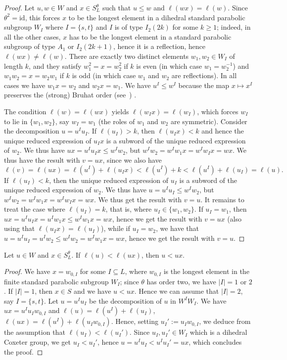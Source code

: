 \documentclass[ALCO, Unicode]{cedram}
\begin{document}
\begin{proof}
	Let $u,w\in W$ and $x\in S_L^\theta$ such that $u\leq w$ and $\ell(wx)=\ell(w)$. Since $\theta^2=\mathrm{id}$, this forces $x$ to be the longest element in a dihedral standard parabolic subgroup $W_I$ where $I=\{s,t\}$ and $I$ is of type $I_2(2k)$ for some $k\geq 1$; indeed, in all the other cases, $x$ has to be the longest element in a standard parabolic subgroup of type $A_1$ or $I_2(2k+1)$, hence it is a reflection, hence $\ell(wx)\neq \ell(w)$. There are exactly two distinct elements $w_1, w_2\in W_I$ of length $k$, and they satisfy $w_1^2=x=w_2^2$ if $k$ is even (in which case $w_1=w_2^{-1}$) and $w_1 w_2=x=w_2 w_1$ if $k$ is odd (in which case $w_1$ and $w_2$ are reflections). In all cases we have $w_1 x=w_2$ and $w_2 x=w_1$. We have $u^I \leq w^I$ because the map $x \mapsto x^I$ preserves the (strong) Bruhat order (see~\cite[Proposition 2.5.1]{BB}) . 
	
	The condition $\ell(w)=\ell(wx)$ yields $\ell(w_I x)=\ell(w_I)$, which forces $w_I$ to lie in $\{w_1, w_2\}$, say $w_I=w_1$ (the roles of $w_1$ and $w_2$ are symmetric). Consider the decomposition $u=u^I u_I$. If $\ell(u_I)>k$, then $\ell(u_I x) < k$ and hence  the unique reduced expression of $u_I x$ is a subword of the unique reduced expression of $w_2$. We thus have $ux = u^I u_Ix \leq w^I w_2$, but $w^I w_2= w^I w_1x=w^I w_I x=wx$. We thus have the result with $v=ux$, since we also have $$\ell(v)=\ell(ux)= \ell(u^I)+\ell(u_I x)< \ell(u^I)+k<\ell(u^I)+\ell(u_I)=\ell(u).$$  
If $\ell(u_I)<k$, then the unique reduced expression of $u_I$ is a subword of the unique reduced expression of $w_2$. We thus have $u=u^I u_I \leq w^I w_2$, but $w^I w_2= w^I w_1 x=w^I w_I x=wx$. We thus get the result with $v=u$. It remains to treat the case where $\ell(u_I)=k$, that is, where $u_I\in \{w_1, w_2\}$. If $u_I=w_1$, then $ux= u^I u_I x= u^I w_1 x \leq w^I w_1 x =wx$, hence we get the result with $v=ux$ (also using that $\ell(u_Ix)=\ell(u_I)$), while if $u_I=w_2$, we have that $u=u^I u_I=u^I w_2 \leq w^I w_2=w^I w_1x=wx$, hence we get the result with $v=u$.
\end{proof}

\begin{lemma}\label{lem_long_gen}
	Let $u\in W$ and $x\in S_L^\theta$. If $\ell(u)< \ell(ux)$, then $u<ux$.
\end{lemma}

\begin{proof}
	We have $x=w_{0,I}$ for some $I\subseteq L$, where $w_{0,I}$ is the longest element in the finite standard parabolic subgroup $W_I$; since $\theta$ has order two, we have $|I|=1$ or $2$. If $|I|=1$, then $x\in S$ and we have $u < ux$. Hence we can assume that $|I|=2$, say $I=\{s,t\}$. Let $u=u^I u_I$ be the decomposition of $u$ in $W^I W_I$. We have $ux=u^I u_I w_{0,I}$ and $\ell(u)=\ell(u^I)+\ell(u_I)$, $\ell(ux)=\ell(u^I)+\ell(u_I w_{0,I})$. Hence, setting $u_I':=u_I w_{0,I}$, we deduce from the assumption that $\ell(u_I)<\ell(u_I')$. Since $u_I, u_I'\in W_I$ which is a dihedral Coxeter group, we get $u_I < u_I'$, hence $u=u^I u_I < u^I u_I'=ux$, which concludes the proof.
\end{proof}
\end{document}
